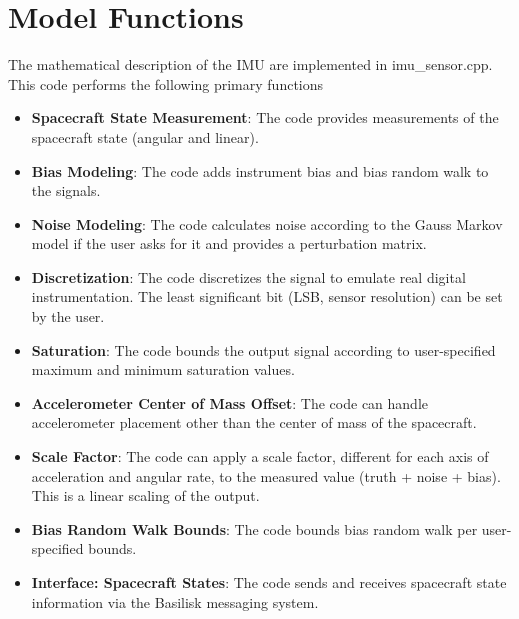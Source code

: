 \section{Model Functions}
The mathematical description of the IMU are implemented in imu\_sensor.cpp. This code performs the following primary functions
\begin{itemize}
	\item \textbf{Spacecraft State Measurement}: The code provides measurements of the spacecraft state (angular and linear).
	\item \textbf{Bias Modeling}: The code adds instrument bias and bias random walk to the signals.
	\item \textbf{Noise Modeling}: The code calculates noise according to the Gauss Markov model if the user asks for it and provides a perturbation matrix.
	\item \textbf{Discretization}: The code discretizes the signal to emulate real digital instrumentation. The least significant bit (LSB, sensor resolution) can be set by the user.
	\item \textbf{Saturation}: The code bounds the output signal according to user-specified maximum and minimum saturation values.
	\item \textbf{Accelerometer Center of Mass Offset}: The code can handle accelerometer placement other than the center of mass of the spacecraft.
	\item \textbf{Scale Factor}: The code can apply a scale factor, different for each axis of acceleration and angular rate, to the measured value (truth + noise + bias). This is a linear scaling of the output.
	\item \textbf{Bias Random Walk Bounds}: The code bounds bias random walk per user-specified bounds.
	\item \textbf{Interface: Spacecraft States}: The code sends and receives spacecraft state information via the Basilisk messaging system.
\end{itemize}


